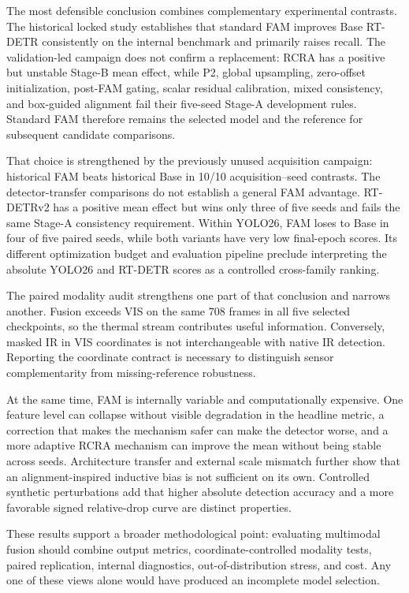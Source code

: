 The most defensible conclusion combines complementary experimental contrasts. The
historical locked study establishes that standard FAM improves Base
RT-DETR consistently on the internal benchmark and primarily raises recall.
The validation-led campaign does not confirm a replacement: RCRA has a
positive but unstable Stage-B mean effect, while P2, global upsampling,
zero-offset initialization, post-FAM gating, scalar residual calibration,
mixed consistency, and box-guided alignment fail their five-seed Stage-A
development rules.
Standard FAM therefore remains the selected model and the reference for
subsequent candidate comparisons.

That choice is strengthened by the previously unused acquisition campaign:
historical FAM beats historical Base in 10/10 acquisition--seed contrasts.
The detector-transfer comparisons do not establish a general FAM advantage.
RT-DETRv2 has a positive mean effect but wins only three of five seeds and
fails the same Stage-A consistency requirement. Within YOLO26, FAM loses to
Base in four of five paired seeds, while both
variants have very low final-epoch scores. Its different optimization budget
and evaluation pipeline preclude interpreting the absolute YOLO26 and RT-DETR
scores as a controlled cross-family ranking.

The paired modality audit strengthens one part of that conclusion and narrows
another. Fusion exceeds VIS on the same 708 frames in all five selected
checkpoints, so the thermal stream contributes useful information. Conversely,
masked IR in VIS coordinates is not interchangeable with native IR detection.
Reporting the coordinate contract is necessary to distinguish sensor
complementarity from missing-reference robustness.

At the same time, FAM is internally variable and computationally expensive.
One feature level can collapse without visible degradation in the headline
metric, a correction that makes the mechanism safer can make the detector
worse, and a more adaptive RCRA mechanism can improve the mean without being
stable across seeds. Architecture transfer and external scale mismatch further
show that an alignment-inspired inductive bias is not sufficient on its own.
Controlled synthetic perturbations add that higher absolute detection accuracy
and a more favorable signed relative-drop curve are distinct properties.

These results support a broader methodological point: evaluating multimodal
fusion should combine output metrics, coordinate-controlled modality tests,
paired replication, internal diagnostics, out-of-distribution stress, and
cost. Any one of these views alone would have produced an incomplete model
selection.

